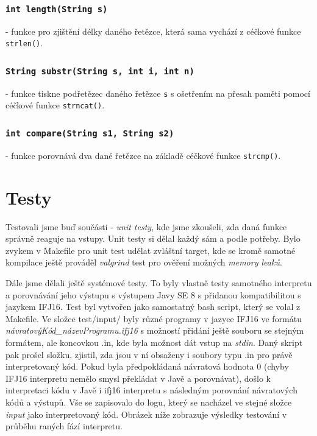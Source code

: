 \documentclass[a4paper,11pt]{article}
\begin{document}
\subsubsection {\texttt{int length(String s)}} - funkce pro zjištění délky daného řetězce, která sama vychází z céčkové funkce \texttt{strlen()}.
\subsubsection {\texttt{String substr(String s, int i, int n)}} - funkce tiskne podřetězec daného řetězce \texttt{s} s ošetřením na přesah paměti pomocí céčkové funkce \texttt{strncat()}.
\subsubsection {\texttt{int compare(String s1, String s2)}} - funkce porovnává dva dané řetězce na základě céčkové funkce \texttt{strcmp()}.


\section{Testy}
Testovali jsme buď součásti - \textit{unit testy}, kde jsme zkoušeli, zda daná funkce správně reaguje na vstupy. Unit testy si dělal každý sám a podle potřeby. Bylo zvykem v Makefile pro unit test udělat zvláštní target, kde se kromě samotné kompilace ještě prováděl \textit{valgrind} test pro ověření možných \textit{memory leaků}. 

Dále jsme dělali ještě systémové testy. To byly vlastně testy samotného interpretu a porovnávání jeho výstupu s výstupem Javy SE 8 s přidanou kompatibilitou s jazykem IFJ16. Test byl vytvořen jako samostatný bash script, který se volal z Makefile. Ve složce test/input/ byly různé programy v jazyce IFJ16 ve formátu \textit{návratovýKód\_názevProgramu.ifj16} s možností přidání ještě souboru se stejným formátem, ale koncovkou .in, kde byla možnost dát vstup na \textit{stdin}. Daný skript pak prošel složku, zjistil, zda jsou v ní obsaženy i soubory typu .in pro právě interpretovaný kód. Pokud byla předpokládaná návratová hodnota 0 (chyby IFJ16 interpretu nemělo smysl překládat v Javě a porovnávat), došlo k interpretaci kódu v Javě i ifj16 interpretu s následným porovnání návratových kódů a výstupů. Vše se zapisovalo do logu, který se nacházel ve stejné složce \textit{input} jako interpretovaný kód. Obrázek níže zobrazuje výsledky testování v průběhu raných fází interpretu.\\
\end{document}
